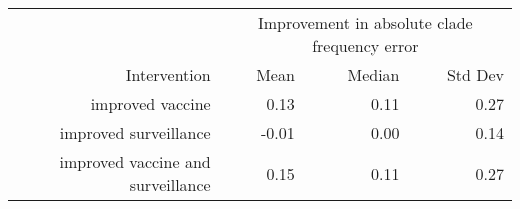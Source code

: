 
\begin{tabular*}{0.7\textwidth}{rrrr}
\toprule
             & \multicolumn{3}{c}{Improvement in absolute clade frequency error} \\
Intervention & Mean & Median & Std Dev \\
\midrule

improved vaccine & 0.13 & 0.11 & 0.27 \\
improved surveillance & -0.01 & 0.00 & 0.14 \\
improved vaccine and surveillance & 0.15 & 0.11 & 0.27 \\

\bottomrule
\end{tabular*}

